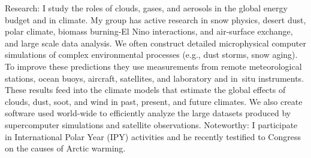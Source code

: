\documentclass[10pt,twoside]{article}
\begin{document}
{{%
Research: I study the roles of clouds, gases, and aerosols in
the global energy budget and in climate.
My group has active research in snow physics, desert dust, polar
climate, biomass burning-El Nino interactions, and air-surface
exchange, and large scale data analysis.   
We often construct detailed microphysical computer simulations of
complex environmental processes (e.g., dust storms, snow aging). 
To improve these predictions they use measurements from 
remote meteorological stations, ocean buoys, aircraft, satellites, and
laboratory and in~situ instruments. 
These results feed into the climate models that estimate the global
effects of clouds, dust, soot, and wind in past, present, and future
climates.       
We also create software used world-wide to efficiently analyze the
large datasets produced by supercomputer simulations and satellite
observations.  
Noteworthy: I participate in International Polar Year (IPY) activities
and he recently testified to Congress on the causes of Arctic warming.   
} %
} %



\end{document}
